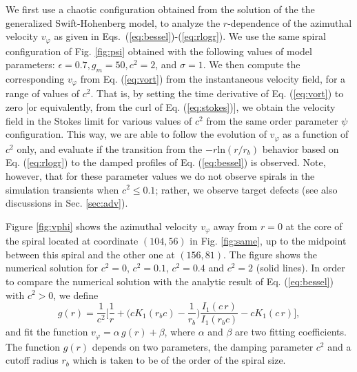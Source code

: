 \documentclass[preprint,prx,floatfix]{revtex4-1}
\begin{document}
We first use a chaotic configuration obtained from the solution of the the generalized Swift-Hohenberg model, to analyze the $r$-dependence of the azimuthal velocity $v_\varphi$ as given in Eqs.~(\ref{eq:bessel})-(\ref{eq:rlogr}). We use the same spiral configuration of Fig. \ref{fig:psi} obtained with the following values of model parameters: $\epsilon = 0.7, g_{m} = 50, c^{2} = 2$, and $\sigma = 1$. We then compute the corresponding $v_\varphi$ from Eq. (\ref{eq:vort}) from the instantaneous velocity field, for a range of values of $c^{2}$. That is, by setting the time derivative of Eq. (\ref{eq:vort}) to zero [or equivalently, from the curl of Eq. (\ref{eq:stokes})], we obtain the velocity field in the Stokes limit for various values of $c^2$ from the same order parameter $\psi$ configuration. This way, we are able to follow the evolution of $v_\varphi$ as a function of $c^2$ only, and evaluate if the transition from the $-r \text{ln} (r/r_b)$ behavior based on Eq. (\ref{eq:rlogr}) to the damped profiles of Eq. (\ref{eq:bessel}) is observed. Note, however, that for these parameter values we do not observe spirals in the simulation transients when $c^{2} \leq 0.1$; rather, we observe target defects (see also discussions in Sec. \ref{sec:adv}). 

Figure \ref{fig:vphi} shows the azimuthal velocity $v_\varphi$ away from $r=0$ at the core of the spiral located at coordinate $(104,56)$ in Fig. \ref{fig:same}, up to the midpoint between this spiral and the other one at $(156,81)$. The figure shows the numerical solution for $c^2 = 0$, $c^2 = 0.1$, $c^2 = 0.4$ and $c^2 = 2$ (solid lines).  In order to compare the numerical solution with the analytic result of Eq. (\ref{eq:bessel}) with $c^{2} > 0$, we define
\begin{equation}
  g(r) = \frac{1}{c^2}\Bigg[ \frac{1}{r}+\Bigg(c K_1(r_b c) - \frac{1}{r_b}\Bigg)\frac{I_1(c\,r)}{I_1(r_b c)} - c K_1(c\,r) \Bigg],
\end{equation}
and fit the function $v_\varphi  = \alpha\,g(r) + \beta$, where $\alpha$ and $\beta$ are two fitting coefficients. The function $g(r)$ depends on two parameters, the damping parameter $c^2$ and a cutoff radius $r_b$ which is taken to be of the order of the spiral size.
\end{document}

